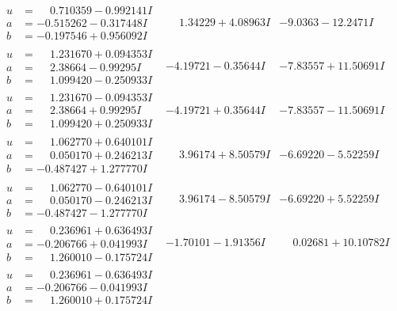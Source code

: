 \documentclass[1p]{elsarticle_modified}
\theoremstyle{definition}
\begin{document}
$$\begin{array}{c|c|c}
\begin{aligned}
u &= \phantom{-}0.710359 - 0.992141 I \\
a &= -0.515262 - 0.317448 I \\
b &= -0.197546 + 0.956092 I\end{aligned}
 & \phantom{-}1.34229 + 4.08963 I & -9.0363 - 12.2471 I \\ \hline\begin{aligned}
u &= \phantom{-}1.231670 + 0.094353 I \\
a &= \phantom{-}2.38664 - 0.99295 I \\
b &= \phantom{-}1.099420 - 0.250933 I\end{aligned}
 & -4.19721 - 0.35644 I & -7.83557 + 11.50691 I \\ \hline\begin{aligned}
u &= \phantom{-}1.231670 - 0.094353 I \\
a &= \phantom{-}2.38664 + 0.99295 I \\
b &= \phantom{-}1.099420 + 0.250933 I\end{aligned}
 & -4.19721 + 0.35644 I & -7.83557 - 11.50691 I \\ \hline\begin{aligned}
u &= \phantom{-}1.062770 + 0.640101 I \\
a &= \phantom{-}0.050170 + 0.246213 I \\
b &= -0.487427 + 1.277770 I\end{aligned}
 & \phantom{-}3.96174 + 8.50579 I & -6.69220 - 5.52259 I \\ \hline\begin{aligned}
u &= \phantom{-}1.062770 - 0.640101 I \\
a &= \phantom{-}0.050170 - 0.246213 I \\
b &= -0.487427 - 1.277770 I\end{aligned}
 & \phantom{-}3.96174 - 8.50579 I & -6.69220 + 5.52259 I \\ \hline\begin{aligned}
u &= \phantom{-}0.236961 + 0.636493 I \\
a &= -0.206766 + 0.041993 I \\
b &= \phantom{-}1.260010 - 0.175724 I\end{aligned}
 & -1.70101 - 1.91356 I & \phantom{-}0.02681 + 10.10782 I \\ \hline\begin{aligned}
u &= \phantom{-}0.236961 - 0.636493 I \\
a &= -0.206766 - 0.041993 I \\
b &= \phantom{-}1.260010 + 0.175724 I\end{aligned}

\end{array}$$
\end{document}
